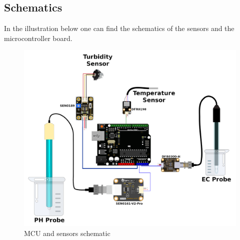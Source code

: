 \newpage
\subsection{Schematics}
In the illustration below one can find the schematics of the sensors and the microcontroller board.
\begin{figure}[h]
\centering
\includegraphics[scale=0.8]{47_schematic.png}
\caption{MCU and sensors schematic}
\end{figure}

